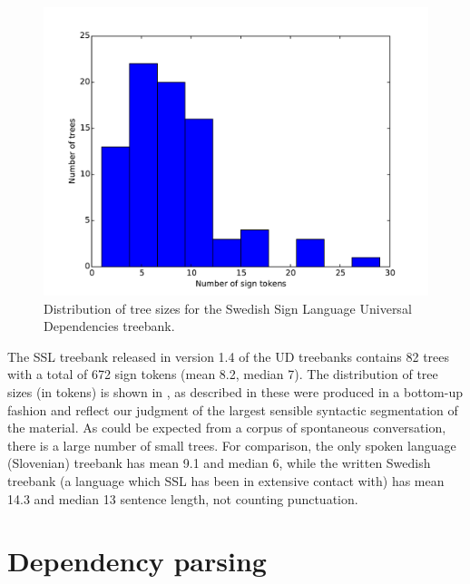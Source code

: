 \documentclass[11pt]{article}
\begin{document}
\begin{figure}[tb]
	\centering
	\includegraphics[width=\linewidth]{treesizes.pdf}
    \caption{Distribution of tree sizes for the Swedish Sign
        Language Universal Dependencies treebank.}
	\label{fig:treesizes}
\end{figure}

The SSL treebank released in version 1.4 of the UD treebanks
contains 82 trees with a total of 672 sign tokens (mean 8.2, median 7).
The distribution of tree sizes (in tokens) is shown in ,
as described in  these were produced in a bottom-up
fashion and reflect our judgment of the largest sensible syntactic
segmentation of the material.
As could be expected from a corpus of spontaneous conversation, there is a
large number of small trees. For comparison, the only spoken language
(Slovenian) treebank has
mean 9.1 and median 6, while the written Swedish treebank (a language which
SSL has been in extensive contact with) has mean 14.3 and median 13 sentence
length, not counting punctuation.

\section{Dependency parsing}
\end{document}
